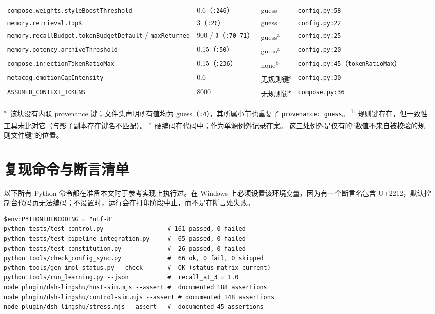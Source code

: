 \begin{table}[t]
\begin{tabular}{@{}p{}p{}p{}p{}@{}}
\texttt{compose.\allowbreak{}weights.\allowbreak{}styleBoostThreshold} & 0.6（\texttt{:246}） & guess & \texttt{config.py:58} \\
\texttt{memory.\allowbreak{}retrieval.\allowbreak{}topK} & 3（\texttt{:20}） & guess & \texttt{config.py:22} \\
\texttt{memory.\allowbreak{}recallBudget.\allowbreak{}tokenBudgetDefault} / \texttt{maxReturned} & 900 / 3（\texttt{:70--71}） & guess\textsuperscript{a} & \texttt{config.py:25} \\
\texttt{memory.\allowbreak{}potency.\allowbreak{}archiveThreshold} & 0.15（\texttt{:50}） & guess\textsuperscript{a} & \texttt{config.py:20} \\
\texttt{compose.\allowbreak{}injectionTokenRatioMax} & 0.15（\texttt{:236}） & none\textsuperscript{b} & \texttt{config.py:45}（\texttt{tokenRatioMax}） \\
\texttt{metacog.\allowbreak{}emotionCapIntensity} & 0.6 & 无规则键\textsuperscript{c} & \texttt{config.py:30} \\
\texttt{ASSUMED\_\allowbreak{}CONTEXT\_\allowbreak{}TOKENS} & 8000 & 无规则键\textsuperscript{c} & \texttt{compose.py:36} \\
\bottomrule
\end{tabular}
\end{table}

\noindent\textsuperscript{a}~该块没有内联 provenance 键；文件头声明所有值均为 guess（\texttt{:4}），其所属小节也重复了 \texttt{provenance: guess}。
\textsuperscript{b}~规则键存在，但一致性工具未比对它（与影子副本存在键名不匹配）。
\textsuperscript{c}~硬编码在代码中；作为单源例外记录在案。
这三处例外是仅有的“数值不来自被校验的规则文件键”的位置。

\section{复现命令与断言清单}

以下所有 Python 命令都在准备本文时于参考实现上执行过。在 Windows 上必须设置该环境变量，因为有一个断言名包含 U+2212，默认控制台代码页无法编码；不设置时，运行会在打印阶段中止，而不是在断言处失败。

\begin{verbatim}
$env:PYTHONIOENCODING = "utf-8"
python tests/test_control.py                  # 161 passed, 0 failed
python tests/test_pipeline_integration.py     #  65 passed, 0 failed
python tests/test_constitution.py             #  26 passed, 0 failed
python tools/check_config_sync.py             #  66 ok, 0 fail, 0 skipped
python tools/gen_impl_status.py --check       #  OK (status matrix current)
python tools/run_learning.py --json           #  recall_at_3 = 1.0
node plugin/dsh-lingshu/host-sim.mjs --assert #  documented 188 assertions
node plugin/dsh-lingshu/control-sim.mjs --assert # documented 148 assertions
node plugin/dsh-lingshu/stress.mjs --assert   #  documented 45 assertions
\end{verbatim}


